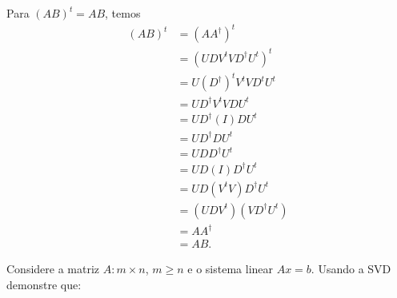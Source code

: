 \documentclass[a4paper,12pt, leqno, answers]{exam}
\begin{document}
\begin{questions}
\begin{solution}
        Para $\left( A B \right)^t = A B$, temos
        \begin{align*}
            \left( A B \right)^t &= \left( A A^\dagger \right)^t \\
            &= \left( U D V^t V D^\dagger U^t \right)^t \\
            &= U \left( D^\dagger \right)^t V^t V D^t U^t \\
            &= U D^\dagger V^t V D U^t \\
            &= U D^\dagger \left( I \right) D U^t \\
            &= U D^\dagger D U^t \\
            &= U D D^\dagger U^t \\
            &= U D \left( I \right) D^\dagger U^t \\
            &= U D \left( V^t V \right) D^\dagger U^t \\
            &= \left( U D V^t \right) \left( V D^\dagger U^t \right) \\
            &= A A^\dagger \\
            &= A B.
        \end{align*}
    \end{solution}

    \question Considere a matriz $A : m \times n$, $m \geq n$ e o sistema linear $A x = b$. Usando a SVD demonstre que:
    \begin{parts}

\end{parts}
\end{questions}
\end{document}
